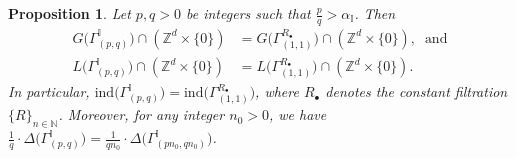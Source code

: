 \documentclass[12pt,a4paper]{amsart}
\theoremstyle{plain}
\newtheorem{proposition}[theorem]{Proposition}
\theoremstyle{definition}
\numberwithin{equation}{theorem}
\begin{document}
\begin{proposition}\label{welldefined}
Let $p,q>0$ be integers such that $\tfrac{p}{q}>\alpha_{\mathbb{I}}$. Then
\begin{align*}
G\big(\Gamma^{\mathbb{I}}_{(p,q)}\big) \cap \left(\mathbb{Z}^d\times \{0\}\right) &= G\big(\Gamma^{R_{\bullet}}_{(1,1)}\big) \cap \left(\mathbb{Z}^d\times \{0\}\right),\;\;\text{and}\\
L\big(\Gamma^{\mathbb{I}}_{(p,q)}\big) \cap \left(\mathbb{Z}^d\times \{0\}\right) &= L\big(\Gamma^{R_{\bullet}}_{(1,1)}\big) \cap \left(\mathbb{Z}^d\times \{0\}\right).
\end{align*}
In particular, $\mathrm{ind}\big(\Gamma^{\mathbb{I}}_{(p,q)}\big)= \mathrm{ind}\big(\Gamma^{{R}_{\bullet}}_{(1,1)}\big)$, where ${R}_{\bullet}$ denotes the constant filtration $\{R\}_{n\in\mathbb{N}}$. Moreover, for any integer $n_0>0$, we have $\frac{1}{q}\cdot\Delta\big(\Gamma^{\mathbb{I}}_{(p,q)}\big) = \frac{1}{qn_0}\cdot\Delta\big(\Gamma^{\mathbb{I}}_{(pn_0,qn_0)}\big)$.
\end{proposition}
\end{document}
